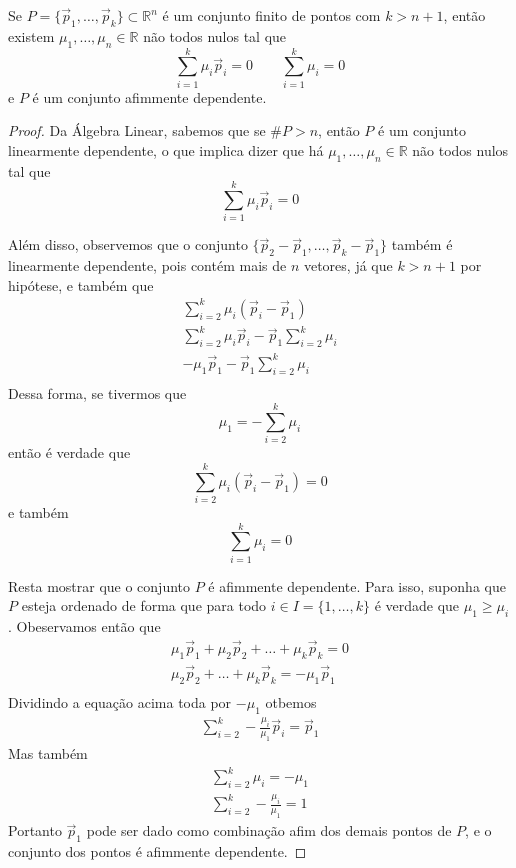 \begin{lemma:afim}
	\label{lemma:afim}
	Se $P = \{\vec p_1, \ldots, \vec p_k\} \subset \mathbb{R}^n$ é um conjunto
	finito de pontos com $k > n + 1$, então existem $\mu_1, \ldots, \mu_n
	\in \mathbb{R}$ não todos nulos tal que
	\begin{equation*}
		\displaystyle\sum_{i=1}^k \mu_i \vec p_i = 0 \quad\quad \displaystyle\sum_{i=1}^k \mu_i = 0
	\end{equation*}
	e $P$ é um conjunto afimmente dependente.

	\begin{proof}
		Da Álgebra Linear, sabemos que se $\#P > n$, então $P$ é um conjunto
		linearmente dependente, o que implica dizer que há $\mu_1, \ldots, \mu_n
		\in \mathbb{R}$ não todos nulos tal que
		\[\displaystyle\sum_{i=1}^k \mu_i \vec p_i = 0\]

		Além disso, observemos que o conjunto $\{\vec p_2 - \vec p_1, \ldots, \vec p_k - \vec p_1\}$
		também é linearmente dependente, pois contém mais de $n$ vetores,
		já que $k > n + 1$ por hipótese,
		e também que
		\begin{gather*}
		  \sum_{i=2}^{k} \mu_i (\vec p_i - \vec p_1) \\
		  \sum_{i=2}^{k} \mu_i \vec p_i - \vec p_1 \sum_{i=2}^{k} \mu_i \\
		  - \mu_1 \vec p_1 - \vec p_1 \sum_{i=2}^{k} \mu_i \\
		\end{gather*}
		Dessa forma, se tivermos que
		\[
		  \mu_1 = - \sum_{i=2}^{k} \mu_i
		\]
		então é verdade que
		\[
		  \sum_{i=2}^{k} \mu_i (\vec p_i - \vec p_1) = 0
		\]
		e também
		\[
		  \sum_{i=1}^{k} \mu_i = 0
		\]

		Resta mostrar que o conjunto $P$ é afimmente dependente. Para isso, suponha
		que $P$ esteja ordenado de forma que para todo $i \in I = \{1, \ldots, k\}$
		é verdade que $\mu_1 \geq \mu_i$. Obeservamos então que
	  \begin{gather*}
	    \mu_1 \vec p_1 + \mu_2 \vec p_2 + \ldots + \mu_k \vec p_k = 0 \\
        \mu_2 \vec p_2 + \ldots + \mu_k \vec p_k = - \mu_1 \vec p_1 \\
	  \end{gather*}
	  Dividindo a equação acima toda por $-\mu_1$ otbemos
	  \begin{gather*}
	    \sum_{i=2}^{k} -\frac{\mu_i}{\mu_1} \vec p_i = \vec p_1
	  \end{gather*}
	  Mas também
	  \begin{gather*}
        \sum_{i=2}^{k} \mu_i = -\mu_1 \\
	    \sum_{i=2}^{k} -\frac{\mu_i}{\mu_1} = 1
	  \end{gather*}
	  Portanto $\vec p_1$ pode ser dado como combinação afim dos demais pontos de
	  $P$, e o conjunto dos pontos é afimmente dependente.
	\end{proof}
\end{lemma:afim}

